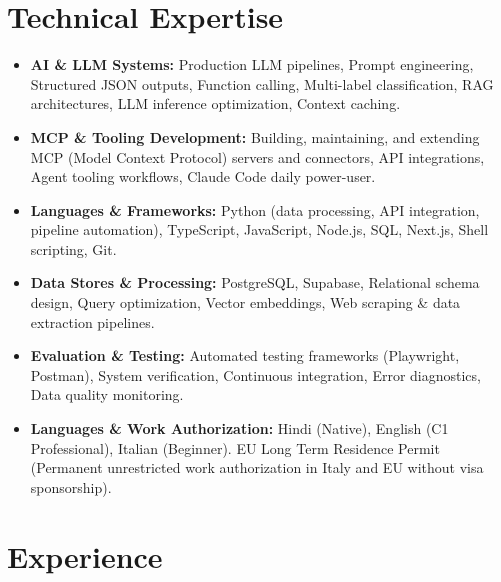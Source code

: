 \documentclass[10pt,a4paper]{article}
\begin{document}
\section{Technical Expertise}
\begin{itemize}
  \item \textbf{AI \& LLM Systems:} Production LLM pipelines, Prompt engineering, Structured JSON outputs, Function calling, Multi-label classification, RAG architectures, LLM inference optimization, Context caching.
  \item \textbf{MCP \& Tooling Development:} Building, maintaining, and extending MCP (Model Context Protocol) servers and connectors, API integrations, Agent tooling workflows, Claude Code daily power-user.
  \item \textbf{Languages \& Frameworks:} Python (data processing, API integration, pipeline automation), TypeScript, JavaScript, Node.js, SQL, Next.js, Shell scripting, Git.
  \item \textbf{Data Stores \& Processing:} PostgreSQL, Supabase, Relational schema design, Query optimization, Vector embeddings, Web scraping \& data extraction pipelines.
  \item \textbf{Evaluation \& Testing:} Automated testing frameworks (Playwright, Postman), System verification, Continuous integration, Error diagnostics, Data quality monitoring.
  \item \textbf{Languages \& Work Authorization:} Hindi (Native), English (C1 Professional), Italian (Beginner). EU Long Term Residence Permit (Permanent unrestricted work authorization in Italy and EU without visa sponsorship).
\end{itemize}

\section{Experience}
\end{document}
